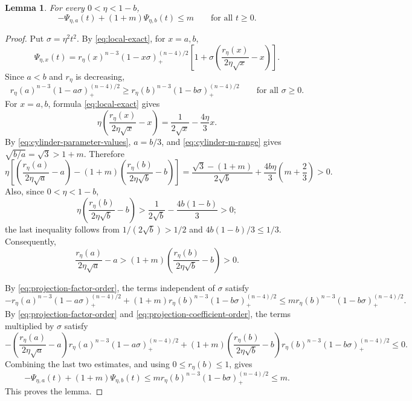 \documentclass[11pt]{article}
\newtheorem{lemma}[theorem]{Lemma}
\theoremstyle{remark}
\newcommand{\pos}[1]{(#1)_{+}}
\begin{document}
\begin{lemma}
\label{lem:projection-boundary-layer}
For every $0<\eta<1-b$,
\begin{equation}\label{eq:Psi-projection-bound}
 -\Psi_{\eta,a}(t)+(1+m)\Psi_{\eta,b}(t)\leq m
 \qquad\text{for all }t\geq0.
\end{equation}
\end{lemma}
\begin{proof}
Put $\sigma=\eta^2t^2$.  By \eqref{eq:local-exact}, for $x=a,b$,
\[
 \Psi_{\eta,x}(t)
 =r_\eta(x)^{n-3}\pos{1-x\sigma}^{(n-4)/2}
 \left[
  1+\sigma\left(\frac{r_\eta(x)}{2\eta\sqrt{x}}-x\right)
 \right].
\]
Since $a<b$ and $r_\eta$ is decreasing,
\begin{equation}\label{eq:projection-factor-order}
 r_\eta(a)^{n-3}\pos{1-a\sigma}^{(n-4)/2}
 \geq
 r_\eta(b)^{n-3}\pos{1-b\sigma}^{(n-4)/2}
 \qquad\text{for all }\sigma\geq0.
\end{equation}
For $x=a,b$, formula \eqref{eq:local-exact} gives
\[
 \eta\left(\frac{r_\eta(x)}{2\eta\sqrt{x}}-x\right)
 =\frac1{2\sqrt{x}}-\frac{4\eta}{3}x.
\]
By \eqref{eq:cylinder-parameter-values}, $a=b/3$, and
\eqref{eq:cylinder-m-range} gives $\sqrt{b/a}=\sqrt3>1+m$.  Therefore
\[
\eta\left[
 \left(\frac{r_\eta(a)}{2\eta\sqrt a}-a\right)
 -(1+m)\left(\frac{r_\eta(b)}{2\eta\sqrt b}-b\right)
 \right]
 =
 \frac{\sqrt3-(1+m)}{2\sqrt b}
 +\frac{4b\eta}{3}\left(m+\frac23\right)>0.
\]
Also, since $0<\eta<1-b$,
\[
 \eta\left(\frac{r_\eta(b)}{2\eta\sqrt b}-b\right)
 >\frac1{2\sqrt b}-\frac{4b(1-b)}3>0;
\]
the last inequality follows from $1/(2\sqrt b)>1/2$ and
$4b(1-b)/3\leq1/3$.  Consequently,
\begin{equation}\label{eq:projection-coefficient-order}
 \frac{r_\eta(a)}{2\eta\sqrt a}-a
 >(1+m)\left(\frac{r_\eta(b)}{2\eta\sqrt b}-b\right)>0.
\end{equation}

By \eqref{eq:projection-factor-order}, the terms independent of $\sigma$
satisfy
\[
-r_\eta(a)^{n-3}\pos{1-a\sigma}^{(n-4)/2}
 +(1+m)r_\eta(b)^{n-3}\pos{1-b\sigma}^{(n-4)/2}
 \leq
 m r_\eta(b)^{n-3}\pos{1-b\sigma}^{(n-4)/2}.
\]
By \eqref{eq:projection-factor-order} and
\eqref{eq:projection-coefficient-order}, the terms multiplied by $\sigma$
satisfy
\[
-\left(\frac{r_\eta(a)}{2\eta\sqrt a}-a\right)
 r_\eta(a)^{n-3}\pos{1-a\sigma}^{(n-4)/2}
 +(1+m)
 \left(\frac{r_\eta(b)}{2\eta\sqrt b}-b\right)
 r_\eta(b)^{n-3}\pos{1-b\sigma}^{(n-4)/2}
 \leq0.
\]
Combining the last two estimates, and using $0\leq r_\eta(b)\leq1$, gives
\[
 -\Psi_{\eta,a}(t)+(1+m)\Psi_{\eta,b}(t)
 \leq m r_\eta(b)^{n-3}\pos{1-b\sigma}^{(n-4)/2}
 \leq m.
\]
This proves the lemma.
\end{proof}
\end{document}
